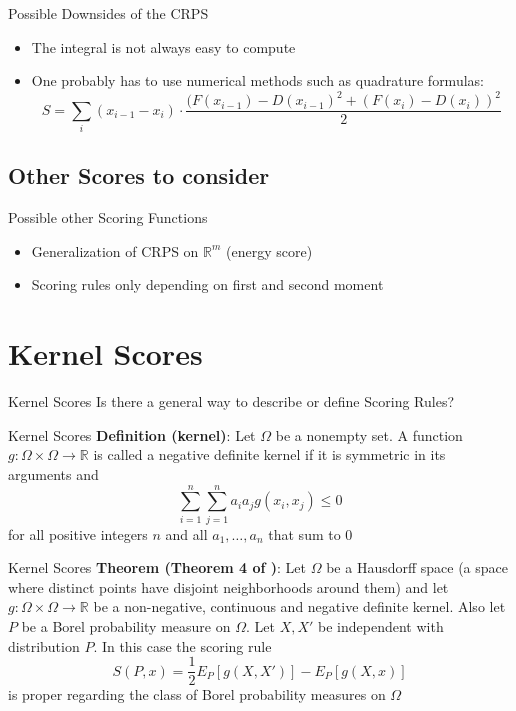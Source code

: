 \documentclass[aspectratio=43,10pt]{beamer}
\begin{document}
\begin{frame}{Possible Downsides of the CRPS}
\begin{itemize}
    \item The integral is not always easy to compute
    \item One probably has to use numerical methods such as quadrature formulas: \begin{equation*}
        S=\sum_i (x_{i-1}-x_i)\cdot\frac{(F(x_{i-1})-D(x_{i-1})^2+(F(x_{i})-D(x_i))^2}{2}
    \end{equation*}
\end{itemize}
    
\end{frame}

\subsection{Other Scores to consider}
\begin{frame}{Possible other Scoring Functions}
\begin{itemize}
    \item Generalization of CRPS on $\mathbb R^m$ (energy score)
    \item Scoring rules only depending on first and second moment
\end{itemize}
\end{frame}
\section{Kernel Scores}
\begin{frame}{Kernel Scores}
    Is there a general way to describe or define Scoring Rules?
\end{frame}

\begin{frame}{Kernel Scores}
    \textbf{Definition (kernel)}: Let $\Omega$ be a nonempty set. A function $g\colon \Omega\times\Omega\to\mathbb R$ is called a negative definite kernel if it is symmetric in its arguments and \begin{equation*}
        \sum_{i=1}^n\sum_{j=1}^n a_ia_j g(x_i,x_j)\leq 0
    \end{equation*}
    for all positive integers $n$ and all $a_1,\dots,a_n$ that sum to $0$
\end{frame}

\begin{frame}{Kernel Scores}
\textbf{Theorem (Theorem 4 of \cite{Gneiting})}: Let $\Omega$ be a Hausdorff space (a space where distinct points have disjoint neighborhoods around them) and let $g\colon\Omega\times\Omega\to\mathbb R$ be a non-negative, continuous and negative definite kernel. Also let $P$ be a Borel probability measure on $\Omega$. Let $X,X'$ be independent with distribution $P$. In this case the scoring rule \begin{equation*}
    S(P,x)=\frac{1}{2}E_P[g(X,X')]-E_P[g(X,x)]
\end{equation*}
is proper regarding the class of Borel probability measures on $\Omega$
    
\end{frame}
\end{document}
